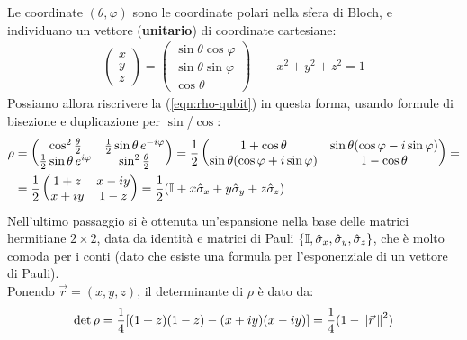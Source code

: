 \documentclass[../../InformazioneQuantistica.tex]{subfiles}
\begin{document}
Le coordinate $(\theta,\varphi)$ sono le coordinate polari nella sfera di Bloch, e individuano un vettore (\textbf{unitario}) di coordinate cartesiane:
\begin{align}
\begin{pmatrix} x\\y \\z\end{pmatrix} =
\begin{pmatrix} \sin\theta \cos\varphi\\
\sin\theta \sin\varphi\\
\cos\theta
\end{pmatrix}
\qquad x^2+y^2+z^2=1
\label{eqn:versore-coord}
\end{align}
Possiamo allora riscrivere la (\ref{eqn:rho-qubit}) in questa forma, usando formule di bisezione e duplicazione per $\sin$/$\cos$:
\begin{align}\nonumber
 \rho &=
\begin{pmatrix}
\cos^2\frac{\theta}{2} & \frac{1}{2}\sin\theta\,e^{-i\varphi}\\
\frac{1}{2}\sin\theta\, e^{i\varphi} & \sin^2\frac{\theta}{2}
\end{pmatrix} =
\frac{1}{2}
\begin{pmatrix}
1+\cos\theta & \sin\theta(\cos\varphi-i\sin\varphi)\\
\sin\theta(\cos\varphi + i\sin\varphi) & 1-\cos\theta
\end{pmatrix} =\\
&= \frac{1}{2} \begin{pmatrix}
1+z & x-iy\\
x+iy & 1-z
\end{pmatrix} = \frac{1}{2} (\mathbb{I} + x \hat{\sigma}_x + y \hat{\sigma}_y + z\hat{\sigma}_z)
\label{eqn:rho-matrix-cartesiana}
\end{align}
Nell'ultimo passaggio si è ottenuta un'espansione nella base delle matrici hermitiane $2\times 2$, data da identità e matrici di Pauli $\{\mathbb{I}, \hat{\sigma}_x, \hat{\sigma}_y, \hat{\sigma}_z\}$, che è molto comoda per i conti (dato che esiste una formula per l'esponenziale di un vettore di Pauli).\\

Ponendo $\vec{r}=(x,y,z)$, il determinante di $\rho$ è dato da: 
\begin{align}
\operatorname{det}\rho = \frac{1}{4}[(1+z)(1-z)-(x+iy)(x-iy)]= \frac{1}{4}(1-\left\lVert\vec{r}\,\right\rVert^2)
\label{eqn:det-rho}
\end{align}
\end{document}

